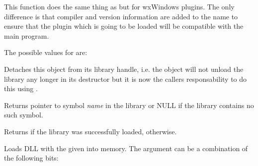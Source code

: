 \label{wxdynamiclibrarycanonicalizepluginname}


This function does the same thing as 
 but for wxWindows
plugins. The only difference is that compiler and version information are added
to the name to ensure that the plugin which is going to be loaded will be
compatible with the main program.

The possible values for  are:

\begin{twocollist}
\end{twocollist}

\label{wxdynamiclibrarydetach}


Detaches this object from its library handle, i.e. the object will not unload
the library any longer in its destructor but it is now the callers
responsability to do this using .

\label{wxdynamiclibrarygetsymbol}


Returns pointer to symbol {\it name} in the library or NULL if the library
contains no such symbol.



\label{wxdynamiclibraryisloaded}


Returns \true if the library was successfully loaded, \false otherwise.

\label{wxdynamiclibraryload}


Loads DLL with the given  into memory. The  argument can
be a combination of the following bits:
\begin{twocollist}
\end{twocollist}

